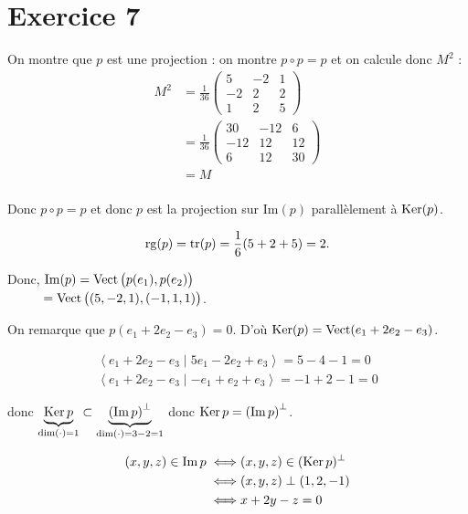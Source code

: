 \part{Exercice 7}

On montre que $p$ est une projection : on montre $p \circ p = p$ et on calcule donc $M^2$ :
\begin{align*}
	M^2 &= \frac{1}{36} \begin{pmatrix}
		5&-2&1\\
		-2&2&2\\
		1&2&5
	\end{pmatrix}\\
	&= \frac{1}{36} \begin{pmatrix}
		30&-12&6\\
		-12&12&12\\
		6&12&30
	\end{pmatrix}\\
	&= M \\
\end{align*}

Donc $p \circ p = p$ et donc $p$ est la projection sur $\mathrm{Im}(p)$ parallèlement à $\operatorname{Ker}(p)$.

\[
	\operatorname{rg}(p) = \operatorname{tr}(p) = \frac{1}{6}(5+2+5) = 2
.\]

Donc, $\mathrm{Im}(p) = \operatorname{Vect}\big(p(e_1),p(e_2)\big)$\\
\phantom{Donc, }$\phantom{\mathrm{Im}(p)}= \Vect\big((5,-2,1),(-1,1,1)\big)$.

On remarque que $p(e_1 + 2e_2 - e_3) = 0$. D'où $\operatorname{Ker}(p) = \operatorname{Vect}(e_1 + 2e_2 - e_3)$.

\begin{gather*}
	\left<e_1+2e_2-e_3 \mid 5e_1-2e_2+e_3 \right> = 5-4-1 = 0\\
	\left<e_1+2e_2-e_3 \mid -e_1 + e_2 + e_3 \right> = -1 + 2 - 1 = 0
\end{gather*}

donc $\underbrace{\operatorname{Ker} p}_{\dim(\cdot) = 1} \subset \underbrace{\left( \mathrm{Im}\, p \right)^\perp}_{\dim(\cdot) = 3 - 2  =1}$ donc $\operatorname{Ker} p = \left( \mathrm{Im}\,p \right)^\perp$.

\begin{align*}
	(x,y,z) \in \mathrm{Im}\, p \iff& (x,y,z) \in (\operatorname{Ker} p)^\perp\\
	\iff& (x,y,z) \perp (1,2,-1)\\
	\iff& x + 2y - z = 0
\end{align*}

